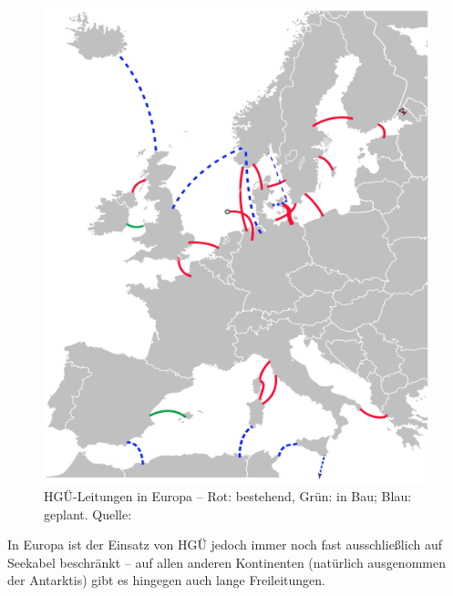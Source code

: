 \begin{figure}[htbn]
\begin{center}
\noindent
\includegraphics[scale=0.5]{HVDC_Europe.png}
\end{center}
\caption{HGÜ-Leitungen in Europa -- Rot: bestehend, Grün: in Bau; Blau: geplant. Quelle: \cite{Europa}}
\label{pic:Europa}
\end{figure}

In Europa ist der Einsatz von HGÜ jedoch immer noch fast ausschließlich auf Seekabel beschränkt -- auf allen anderen Kontinenten (natürlich ausgenommen der Antarktis) gibt es hingegen auch lange Freileitungen.


